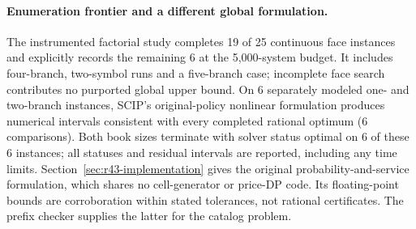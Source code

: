 \paragraph{Enumeration frontier and a different global formulation.}
The instrumented factorial study completes 19 of 25 continuous face instances and explicitly records the remaining 6 at the 5,000-system budget. It includes four-branch, two-symbol runs and a five-branch case; incomplete face search contributes no purported global upper bound. On 6 separately modeled one- and two-branch instances, SCIP's original-policy nonlinear formulation produces numerical intervals consistent with every completed rational optimum (6 comparisons). Both book sizes terminate with solver status optimal on 6 of these 6 instances; all statuses and residual intervals are reported, including any time limits. Section~\ref{sec:r43-implementation} gives the original probability-and-service formulation, which shares no cell-generator or price-DP code. Its floating-point bounds are corroboration within stated tolerances, not rational certificates. The prefix checker supplies the latter for the catalog problem.
